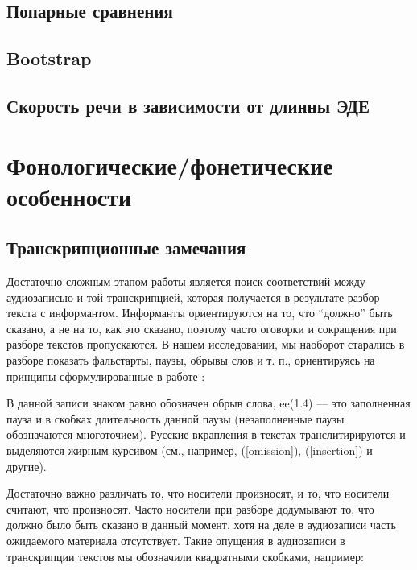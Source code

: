 \subsection{Попарные сравнения}
\subsection{Bootstrap}
\subsection{Скорость речи в зависимости от длинны ЭДЕ}
\pagebreak
\section{Фонологические/фонетические особенности}
\subsection{Транскрипционные замечания}
\noindent Достаточно сложным этапом работы является поиск соответствий между аудиозаписью и той транскрипцией, которая получается в результате разбор текста с информантом. Информанты ориентируются на то, что ``должно'' быть сказано, а не на то, как это сказано, поэтому часто оговорки и сокращения при разборе текстов пропускаются. В нашем исследовании, мы наоборот старались в разборе показать фальстарты, паузы, обрывы слов и т. п., ориентируясь на принципы сформулированные в работе \citep{kibrik14}:
\par В данной записи знаком равно обозначен обрыв слова, ee(1.4) --- это заполненная пауза и в скобках длительность данной паузы (незаполненные паузы обозначаются многоточием). Русские вкрапления в текстах транслитирируются и выделяются жирным курсивом (см., например, (\ref{omission}), (\ref{insertion}) и другие).
\par Достаточно важно различать то, что носители произносят, и то, что носители считают, что произносят. Часто носители при разборе додумывают то, что должно было быть сказано в данный момент, хотя на деле в аудиозаписи часть ожидаемого материала отсутствует. Такие опущения в аудиозаписи в транскрипции текстов мы обозначили квадратными скобками, например:
